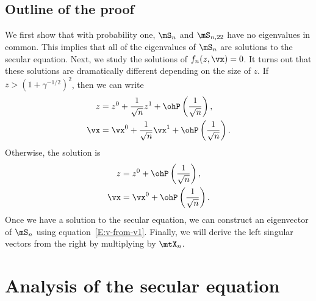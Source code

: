 \subsection{Outline of the proof}

We first show that with probability one, $\mS_n$ and $\mS_{n,22}$ have no eigenvalues in common.  This implies that all of the eigenvalues of $\mS_n$ are solutions to the secular equation.  Next, we study the solutions of 
$f_n(z, \vx) = 0$.  It turns out that these solutions are dramatically different depending on the size of $z$.  If $z > (1 + \gamma^{-1/2})^2$,
then we can write
\begin{align*}
    z 
        &= 
            z^0 
            + 
            \frac{1}{\sqrt{n}}
            z^1 
            + 
            \ohP\left( \frac{1}{\sqrt{n}} \right), \\
    \vx
        &=
            \vx^0
            +
            \frac{1}{\sqrt{n}}
            \vx^1
            + 
            \ohP\left( \frac{1}{\sqrt{n}} \right).
\end{align*}
Otherwise, the solution is
\begin{align*}
    z
        &=
            z^0
            + 
            \ohP\left( \frac{1}{\sqrt{n}} \right), \\
    \vx
        &=
            \vx^0
            +
            \ohP\left( \frac{1}{\sqrt{n}} \right).
\end{align*}
Once we have a solution to the secular equation, we can construct an
eigenvector of $\mS_n$ using equation~\eqref{E:v-from-v1}.  Finally, we will derive the left singular vectors from the right by multiplying by $\mtX_n$.

\section{Analysis of the secular equation}

